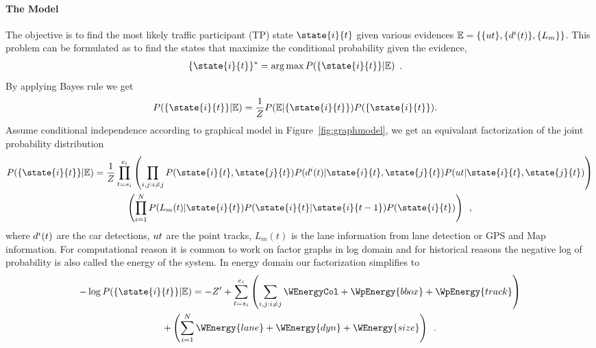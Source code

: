\paragraph{The Model}

The objective is to find the most likely traffic participant (TP) state $\state{i}{t}$ given
various evidences $\mathbb{E} = \{\{ut\}, \{d^{i}(t)\}, \{L_m\}\}$. This problem can be formulated as to find the states that maximize the conditional probability given the evidence,
%
\begin{align}
  \{\state{i}{t}\}^* &= \arg \max P(\{\state{i}{t}\} | \mathbb{E})\enspace.
\end{align}
%
By applying Bayes rule we get
\begin{align}
  P(\{\state{i}{t}\} | \mathbb{E}) &=
  \frac{1}{Z}P( \mathbb{E} | \{\state{i}{t}\})P(\{\state{i}{t}\}).
\end{align}
%
Assume conditional independence according to graphical model in Figure~\ref{fig:graphmodel}, we get an equivalant factorization of the joint probability distribution
%
\begin{multline}
  P(\{\state{i}{t}\} | \mathbb{E}) =
  \frac{1}{Z}
  \prod_{t=s_i}^{e_i}
  \left(
  \prod_{i,j: i \ne j}
  P(\state{i}{t}, \state{j}{t})
  P(\bb{i} | \state{i}{t}, \state{j}{t})
  P(\trackp{t} | \state{i}{t}, \state{j}{t})
\right)
\\
\left(
  \prod_{i=1}^{N}
  P(L_m(t) | \state{i}{t})
  P(\state{i}{t} | \state{i}{t-1})
  P(\state{i}{t})
\right)
  \enspace ,
\end{multline}
where $d^{i}(t)$ are the car detections, $ut$ are the point tracks, $L_m(t)$ is the lane information from lane detection or GPS and Map information.
For computational reason it is common to work on factor graphs in log domain
and for historical reasons the negative log of probability is also called the energy of the system. In energy domain our factorization simplifies to
%
\begin{multline}
  -\log{P(\{\state{i}{t}\} | \mathbb{E})} = 
  -Z' 
  + \sum_{t=s_i}^{e_i}
  \left(
  \sum_{i,j:i\ne j}   
  \WEnergyCol 
   + \WpEnergy{bbox}
   + \WpEnergy{track}
\right)
  \\
  + \left(
  \sum_{i=1}^N 
  \WEnergy{lane}
  + \WEnergy{dyn}
  + \WEnergy{size}
\right)
  \enspace.
\end{multline}
%
